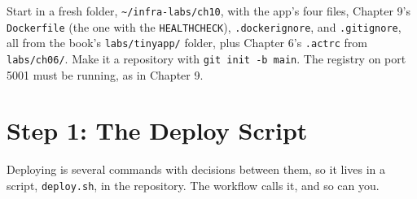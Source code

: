 Start in a fresh folder, \texttt{\textasciitilde{}/infra-labs/ch10}, with the app's four files, Chapter 9's \texttt{Dockerfile} (the one with the \texttt{HEALTHCHECK}), \texttt{.dockerignore}, and \texttt{.gitignore}, all from the book's \texttt{labs/tinyapp/} folder, plus Chapter 6's \texttt{.actrc} from \texttt{labs/ch06/}. Make it a repository with \texttt{git\ init\ -b\ main}. The registry on port 5001 must be running, as in Chapter 9.

\section{Step 1: The Deploy Script}\label{10-lab-deploy-on-every-push:step-1-the-deploy-script}

Deploying is several commands with decisions between them, so it lives in a script, \texttt{deploy.sh}, in the repository. The workflow calls it, and so can you.

